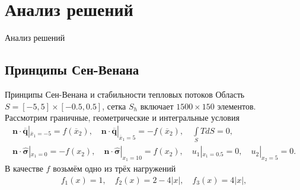 \section{Анализ решений}

\begin{frame}
	\centering
	\Huge
	Анализ решений
\end{frame}

\subsection{Принципы Сен-Венана}
\begin{frame}{Принципы Сен-Венана и стабильности тепловых потоков}
\justifying
Область $S = [-5, 5] \times [-0.5, 0.5]$, сетка $S_h$ включает $1500 \times 150$ элементов.\\
Рассмотрим граничные, геометрические и интегральные условия
\begin{gather*}
	\boldsymbol{n} \cdot \overline{\boldsymbol{q}} |_{\overline{x}_1 = -5} = f(\overline{x}_2),
	\quad
	\boldsymbol{n} \cdot \overline{\boldsymbol{q}} |_{\overline{x}_1 = 5} = -f(\overline{x}_2),
	\quad
	\int\limits_S T dS = 0, \\
	\boldsymbol{n} \cdot \widehat{\boldsymbol{\sigma}} |_{x_1 = 0} = -f(x_2),
	\quad
	\boldsymbol{n} \cdot \widehat{\boldsymbol{\sigma}} |_{x_1 = 10} = f(x_2),
	\quad
	u_1 |_{x_1 = 0.5} = 0,
	\quad
	u_2 |_{x_2 = 5} = 0.
\end{gather*}
В качестве $f$ возьмём одно из трёх нагружений
\begin{gather*}
	f_1 (x) = 1,
	\quad
	f_2 (x) = 2 - 4 |x|,
	\quad
	f_3 (x) = 4 |x|,
\end{gather*}


\end{frame}
